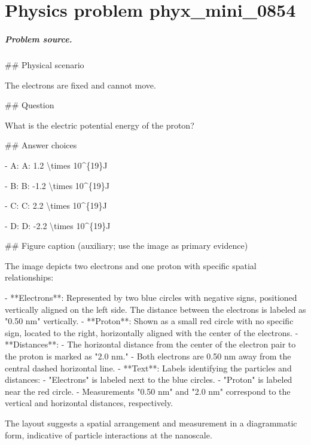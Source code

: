
\chapter{Physics problem phyx\_mini\_0854}
\label{ch:PhyXMiniProblems_problem_phyx_mini_0854}

\paragraph{Problem source.}
\#\# Physical scenario

The electrons are fixed and cannot move.

\#\# Question

What is the electric potential energy of the proton?

\#\# Answer choices

- A: A: 1.2 \textbackslash{}times 10\textasciicircum{}\{19\}J

- B: B: -1.2 \textbackslash{}times 10\textasciicircum{}\{19\}J

- C: C: 2.2 \textbackslash{}times 10\textasciicircum{}\{19\}J

- D: D: -2.2 \textbackslash{}times 10\textasciicircum{}\{19\}J

\#\# Figure caption (auxiliary; use the image as primary evidence)

The image depicts two electrons and one proton with specific spatial relationships:

- **Electrons**: Represented by two blue circles with negative signs, positioned vertically aligned on the left side. The distance between the electrons is labeled as "0.50 nm" vertically.
- **Proton**: Shown as a small red circle with no specific sign, located to the right, horizontally aligned with the center of the electrons.
- **Distances**: 
  - The horizontal distance from the center of the electron pair to the proton is marked as "2.0 nm."
  - Both electrons are 0.50 nm away from the central dashed horizontal line.
- **Text**: Labels identifying the particles and distances:
  - "Electrons" is labeled next to the blue circles.
  - "Proton" is labeled near the red circle.
  - Measurements "0.50 nm" and "2.0 nm" correspond to the vertical and horizontal distances, respectively.
  
The layout suggests a spatial arrangement and measurement in a diagrammatic form, indicative of particle interactions at the nanoscale.

